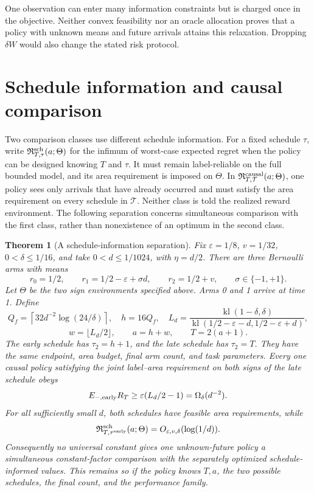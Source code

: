 \documentclass[11pt]{article}
\newtheorem{theorem}{Theorem}[section]
\theoremstyle{remark}
\newcommand{\kl}{\operatorname{kl}}
\begin{document}
One observation can enter many information constraints but is charged once
in the objective. Neither convex feasibility nor an oracle allocation proves
that a policy with unknown means and future arrivals attains this relaxation.
Dropping $\delta W$ would also change the stated risk protocol.


\section{Schedule information and causal comparison}
\label{app:schedule-information}

Two comparison classes use different schedule information. For a fixed
schedule $\tau$, write $\mathfrak R^{\rm sch}_{T,\tau}(a;\Theta)$ for the
infimum of worst-case expected regret when the policy can be designed
knowing $T$ and $\tau$. It must remain label-reliable on the full bounded
model, and its area requirement is imposed on $\Theta$. In
$\mathfrak R^{\rm causal}_{T,\mathcal T}(a;\Theta)$, one policy sees only
arrivals that have already occurred and must satisfy the area requirement
on every schedule in $\mathcal T$. Neither class is told the realized
reward environment. The following separation concerns simultaneous
comparison with the first class, rather than nonexistence of an optimum
in the second class.

\begin{theorem}[A schedule-information separation]
\label{thm:schedule-separation}
Fix $\varepsilon=1/8$, $v=1/32$, $0<\delta\le1/16$, and take
$0<d\le1/1024$, with $\eta=d/2$. There are three Bernoulli arms with means
\[
 r_0=1/2,\qquad r_1=1/2-\varepsilon+\sigma d,\qquad
 r_2=1/2+v,\qquad \sigma\in\{-1,+1\}.
\]
Let $\Theta$ be the two sign environments specified above. Arms 0 and 1 arrive at time 1. Define
\[
 Q_f=\left\lceil32d^{-2}\log(24/\delta)\right\rceil,
 \quad h=16Q_f,\quad
 L_d=\frac{\kl(1-\delta,\delta)}
 {\kl(1/2-\varepsilon-d,1/2-\varepsilon+d)},
\]
\[
 w=\lfloor L_d/2\rfloor,\qquad a=h+w,\qquad T=2(a+1).
\]
The early schedule has $\tau_2=h+1$, and the late schedule has $\tau_2=T$.
They have the same endpoint, area budget, final arm count, and task
parameters. Every one causal policy satisfying the joint label--area
requirement on both signs of the late schedule obeys
\[
 E_{-,\rm early}R_T\ge\varepsilon(L_d/2-1)=\Omega_\delta(d^{-2}).
\]
For all sufficiently small $d$, both schedules have feasible area
requirements, while
\[
 \mathfrak R^{\rm sch}_{T,\tau^{\rm early}}(a;\Theta)
       =O_{\varepsilon,v,\delta}(\log(1/d)).
\]
Consequently no universal constant gives one unknown-future policy a
simultaneous constant-factor comparison with the separately optimized
schedule-informed values. This remains so if the policy knows $T,a$,
the two possible schedules, the final count, and the performance family.
\end{theorem}
\end{document}
